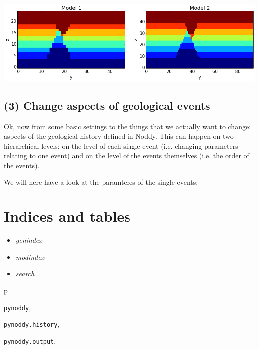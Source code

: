 \documentclass[letterpaper,10pt,english]{sphinxmanual}
\begin{document}
\includegraphics{2-Adjust-input_12_01.png}


\section{(3) Change aspects of geological events}
\label{notebooks/2-Adjust-input:change-aspects-of-geological-events}
Ok, now from some basic settings to the things that we actually want to
change: aspects of the geological history defined in Noddy. This can
happen on two hierarchical levels: on the level of each single event
(i.e. changing parameters relating to one event) and on the level of the
events themselves (i.e. the order of the events).

We will here have a look at the paramteres of the single events:


\chapter{Indices and tables}
\label{index:indices-and-tables}\begin{itemize}
\item {} 
\emph{genindex}

\item {} 
\emph{modindex}

\item {} 
\emph{search}

\end{itemize}


\renewcommand{\indexname}{Python Module Index}
\begin{theindex}
\def\bigletter#1{{\Large\sffamily#1}\nopagebreak\vspace{1mm}}
\bigletter{p}
\item {\texttt{pynoddy}}, \pageref{pynoddy:module-pynoddy}
\item {\texttt{pynoddy.history}}, \pageref{pynoddy:module-pynoddy.history}
\item {\texttt{pynoddy.output}}, \pageref{pynoddy:module-pynoddy.output}
\end{theindex}

\renewcommand{\indexname}{Index}
\printindex
\end{document}
